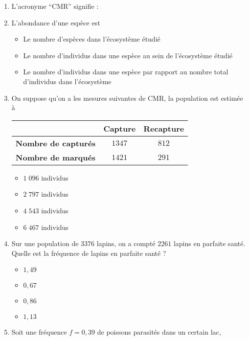 \documentclass[11pt]{article}
\begin{document}
\begin{enumerate}
  \item L'acronyme ``CMR'' signifie :
  \item L'abondance d'une espèce est
    \begin{itemize}[label=$\Box$]
      \item Le nombre d'espèces dans l'écosystème étudié
      \item Le nombre d'individus dans une espèce au sein de l'écosystème étudié
      \item {\small Le nombre d'individus dans une espèce par rapport au nombre total
        d'individus dans l'écosystème}
    \end{itemize}
  \item On suppose qu'on a les mesures suivantes de CMR, la population est
    estimée à
\begin{center}
\begin{tabular}{ccc}
  \toprule
  & \textbf{Capture} & \textbf{Recapture} \\ \midrule
  \textbf{Nombre de capturés} & $1347$ & $812$ \\
  \textbf{Nombre de marqués} & $1421$ & $291$ \\ \bottomrule
 \end{tabular}
\end{center}
\begin{multicols}{2}
\begin{itemize}[label=$\Box$]
  \item $1\;096$ individus
  \item $2\;797$ individus
  \item $4\;543$ individus
  \item $6\;467$ individus
\end{itemize}
\end{multicols}
\item Sur une population de $3376$ lapins, on a compté $2261$ lapins en parfaite
  santé. Quelle est la fréquence de lapins en parfaite santé ?
  \begin{multicols}{4}
  \begin{itemize}[label=$\Box$]
    \item $1,49$
    \item $0,67$
    \item $0,86$
    \item $1,13$
  \end{itemize}
  \end{multicols}
\item Soit une fréquence $f=0,39$ de poissons parasités dans un certain lac,

\end{enumerate}
\end{document}

